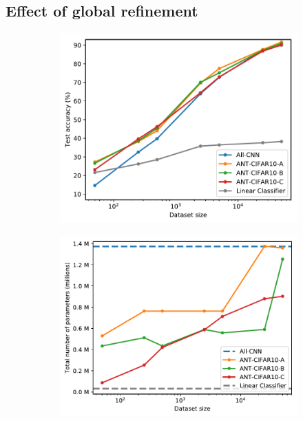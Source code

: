 \subsection{Effect of global refinement} \label{sec:refinement}
\begin{figure}[t!]
	\centering
	\begin{subfigure}[t]{0.48\linewidth}
		\caption{}
		\includegraphics[width=\linewidth]{chapter_7/figures/fig_1_2.pdf}
	\end{subfigure}
	\hspace{0mm}
	\begin{subfigure}[t]{0.50\linewidth}
		\caption{}
		\includegraphics[width=\linewidth]{chapter_7/figures/fig_2_2.pdf}

\end{subfigure}
\end{figure}
